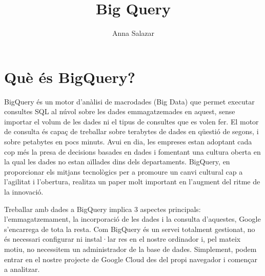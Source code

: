 \documentclass[12pt,longbibliography]{article}
\title{Big Query}
\author{Anna Salazar}
\theoremstyle{definition}
\theoremstyle{remark}
\begin{document}
\begin{titlepage}
\maketitle

\vspace{140mm}

\par
{}%
\hfill
{}%
\par

\end{titlepage}

\tableofcontents

\pagebreak


\section{Què és BigQuery?}

BigQuery és un motor d’anàlisi de macrodades (Big Data) que permet executar consultes SQL al núvol sobre les dades emmagatzemades en aquest, sense importar el volum de les dades ni el tipus de consultes que es volen fer. El motor de consulta és capaç de treballar sobre terabytes de dades en qüestió de segons, i sobre petabytes en pocs minuts. Avui en dia, les empreses estan adoptant cada cop més la presa de decisions basades en dades i fomentant una cultura oberta en la qual les dades no estan aïllades dins dels departaments. BigQuery, en proporcionar els mitjans tecnològics per a promoure un canvi cultural cap a l’agilitat i l’obertura, realitza un paper molt important en l’augment del ritme de la innovació.

\vspace{2mm}

Treballar amb dades a BigQuery implica 3 aspectes principals: l’emmagatzemament, la incorporació de les dades i la consulta d’aquestes, Google s’encarrega de tota la resta. Com BigQuery és un servei totalment gestionat, no és necessari configurar ni instal·lar res en el nostre ordinador i, pel mateix motiu, no necessitem un administrador de la base de dades. Simplement, podem entrar en el nostre projecte de Google Cloud des del propi navegador i començar a analitzar.
\end{document}
